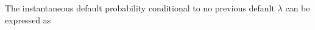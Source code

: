 %
%
%
%
%
%
%
%
The instantaneous default probability conditional to no previous default $\lambda$ can be expressed as

